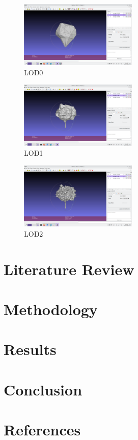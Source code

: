 \documentclass[12pt]{article}
\begin{document}
\begin{figure}[H]
    \vspace{1.5cm}
    \centering
    \includegraphics[width=0.5\textwidth]{images/LOD0.png}
    \caption{LOD0}
\end{figure}

\begin{figure}[H]
    \vspace{1.5cm}
    \centering
    \includegraphics[width=0.5\textwidth]{images/LOD1.png}
    \caption{LOD1}
\end{figure}

\begin{figure}[H]
    \vspace{1.5cm}
    \centering
    \includegraphics[width=0.5\textwidth]{images/LOD2.png}
    \caption{LOD2}
\end{figure}


\newpage
\section{Literature Review}

\newpage

\section{Methodology}

\newpage

\section{Results}

\newpage

\section{Conclusion}

\newpage

\section{References}
\nocite{*}


\end{document}
